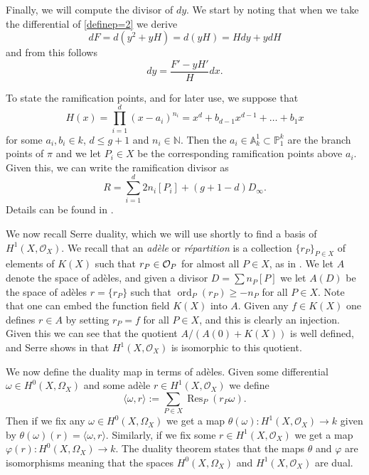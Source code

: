 \documentclass[draft, 11pt]{article} %
\theoremstyle{plain}
\theoremstyle{remark}
\newcommand{\cO}{{\cal O}}
\newcommand{\hzero}{{H^0(X,\Omega_X)}}
\newcommand{\hone}{H^1(X,\mathcal{O}_X)}
\DeclareMathOperator{\res}{Res}
\DeclareMathOperator{\ord}{ord}
\begin{document}
Finally, we will compute the divisor of $dy$.
We start by noting that when we take the differential of \eqref{definep=2} we derive
\[
dF = d\left(y^2 + yH \right) = d(yH) = Hdy + ydH
\]
and from this follows 
\begin{equation}\label{divdyp=2}
dy = \frac{F'-yH'}{H}dx.
\end{equation}


To state the ramification points, and for later use, we suppose that 
\begin{equation}\label{hcoefficients}
H(x) = \prod_{i=1}^d (x-a_i)^{n_i} = x^d + b_{d-1}x^{d-1} + \ldots + b_1x
\end{equation}
for some $a_i, b_i \in  k$, $d \leq g+1$ and $n_i \in \mathbb N$.
Then the $a_i \in \mathbb A_k^1 \subset \mathbb P_1^k$ are the branch points of $\pi$ and we let $P_i \in X$ be the corresponding ramification points above $a_i$.
Given this, we can write the ramification divisor as
\[
R = \sum_{i=1}^d 2n_i[P_i] + (g+1-d)D_\infty.
\]
Details can be found in \cite[\S 6]{faithfulaction}.

We now recall Serre duality, which we will use shortly to find a basis of $\hone$.
We recall  that an {\sl ad\`ele} or {\sl r\'epartition} is a collection $\{r_P\}_{P\in X}$ of elements of $K(X)$ such that $r_P \in \cO_P$ for almost all $P\in X$, as in \cite[Chap. II, \S 5]{algebraicgroupsandclassfields}.
We let $A$ denote the space of ad\`eles, and given a divisor $D = \sum n_P[P]$ we let $A(D)$ be the space of ad\`eles $r = \{r_P\}$ such that $\ord_P(r_P) \geq -n_P$ for all $P \in X$.
Note that one can embed the function field $K(X)$ into $A$.
Given any $f \in K(X)$ one defines $r \in A$ by setting $r_P = f$ for all $P \in X$, and this is clearly an injection.
Given this we can see that the quotient $A/(A(0) + K(X))$ is well defined, and Serre shows in \cite[Prop. 3, Chap II]{algebraicgroupsandclassfields} that $\hone$ is isomorphic to this quotient.

We now define the duality map in terms of ad\`eles.
Given some differential $\omega \in \hzero$ and some ad\`ele $r \in \hone$ we define 
\[
\langle \omega, r \rangle := \sum_{P\in X} \res_{P}( r_P\omega).
\]
Then if we fix any $\omega \in \hzero$ we get a map $\theta(\omega):\hone \rightarrow k$ given by $\theta(\omega)(r) = \langle \omega, r \rangle$.
Similarly, if we fix some $r \in \hone$ we get a map $\varphi(r):\hzero \rightarrow k$.
The duality theorem \cite[Thm. 2, Chap. II]{algebraicgroupsandclassfields} states that the maps $\theta$ and $\varphi$ are isomorphisms meaning that the spaces $\hzero$ and $\hone$ are dual.
\end{document}
